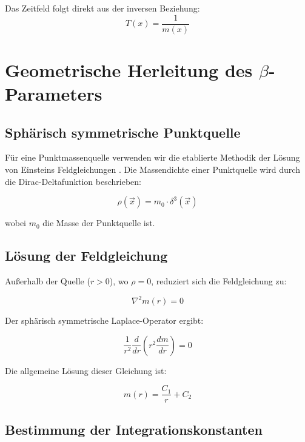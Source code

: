 	Das Zeitfeld folgt direkt aus der inversen Beziehung:
	\begin{equation}
		\label{eq:time_field_definition}
		T(x) = \frac{1}{m(x)}
	\end{equation}
	
	\section{Geometrische Herleitung des $\beta$-Parameters}
	\label{sec:beta_derivation}
	
	\subsection{Sphärisch symmetrische Punktquelle}
	\label{subsec:spherical_solution}
	
	Für eine Punktmassenquelle verwenden wir die etablierte Methodik der Lösung von Einsteins Feldgleichungen \citep{schwarzschild1916,misner1973}. Die Massendichte einer Punktquelle wird durch die Dirac-Deltafunktion beschrieben:
	
	\begin{equation}
		\rho(\vec{x}) = m_0 \cdot \delta^3(\vec{x})
	\end{equation}
	
	wobei $m_0$ die Masse der Punktquelle ist.
	
	\subsection{Lösung der Feldgleichung}
	\label{subsec:field_solution}
	
	Außerhalb der Quelle ($r > 0$), wo $\rho = 0$, reduziert sich die Feldgleichung zu:
	
	\begin{equation}
		\nabla^2 m(r) = 0
	\end{equation}
	
	Der sphärisch symmetrische Laplace-Operator \citep{jackson1998,griffiths1999} ergibt:
	
	\begin{equation}
		\frac{1}{r^2}\frac{d}{dr}\left(r^2 \frac{dm}{dr}\right) = 0
	\end{equation}
	
	Die allgemeine Lösung dieser Gleichung ist:
	
	\begin{equation}
		m(r) = \frac{C_1}{r} + C_2
	\end{equation}
	
	\subsection{Bestimmung der Integrationskonstanten}
	\label{subsec:integration_constants}
	
